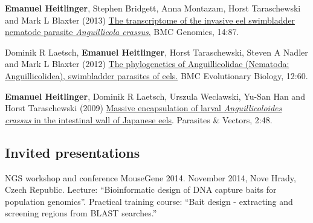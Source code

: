 \documentclass[10pt,a4paper]{article}
\renewenvironment{itemize}{
  \begin{list}{}{
    \setlength{\leftmargin}{2.5em}
    \setlength{\itemsep}{0.25em}
    \setlength{\parskip}{0pt}
    \setlength{\parsep}{0.25em}
  }
}{
  \end{list}
}
\begin{document}
\begin{itemize}
\item \textbf{Emanuel Heitlinger}, Stephen Bridgett, Anna Montazam,
  Horst Taraschewski and Mark L Blaxter (2013)
  \href{http://www.biomedcentral.com/1471-2164/14/87}{The
    transcriptome of the invasive eel swimbladder nematode parasite
    \textit{Anguillicola crassus}.} BMC Genomics, 
  14:87.

\item Dominik R Laetsch, \textbf{Emanuel Heitlinger}, Horst
  Taraschewski, Steven A Nadler and Mark L Blaxter (2012)
  \href{http://www.biomedcentral.com/1471-2148/12/60} {The
    phylogenetics of Anguillicolidae (Nematoda: Anguillicolidea),
    swimbladder parasites of eels.} BMC Evolutionary Biology,
  12:60.

\item \textbf{Emanuel Heitlinger}, Dominik R Laetsch, Urszula
  Weclawski, Yu-San Han and Horst Taraschewski (2009)
  \href{http://www.parasitesandvectors.com/content/2/1/48}{Massive
    encapsulation of larval \textit{Anguillicoloides crassus} in the
    intestinal wall of Japanese eels}. Parasites \& Vectors,
  2:48.
\end{itemize}

%



\subsection*{Invited presentations}

\begin{itemize}

\item NGS workshop and conference MouseGene 2014. November 2014, Nove
  Hrady, Czech Republic. Lecture: ``Bioinformatic design of DNA
  capture baits for population genomics''. Practical training course:
  ``Bait design - extracting and screening regions from BLAST
  searches.''

\end{itemize}
\end{document}
